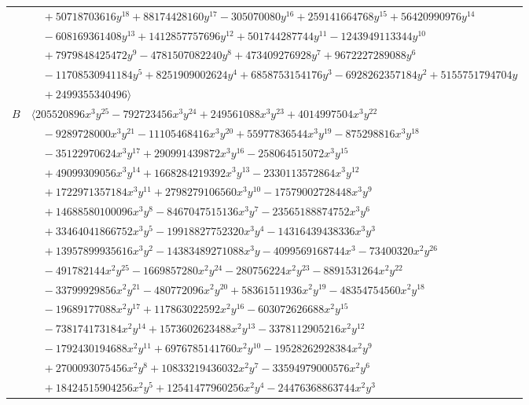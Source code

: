 \documentclass[11pt]{article}
\begin{document}
\begin{longtable}{@{}ll@{}}
 & $\quad +50718703616y^{18}+88174428160y^{17}-305070080y^{16}+259141664768y^{15}+56420990976y^{14}$\\
 & $\quad -608169361408y^{13}+1412857757696y^{12}+501744287744y^{11}-1243949113344y^{10}$\\
 & $\quad +7979848425472y^{9}-4781507082240y^{8}+473409276928y^{7}+9672227289088y^{6}$\\
 & $\quad -11708530941184y^{5}+8251909002624y^{4}+6858753154176y^{3}-6928262357184y^{2}+5155751794704y$\\
 & $\quad +2499355340496\rangle$\\
$B$ & $\langle 205520896x^{3}y^{25}-792723456x^{3}y^{24}+249561088x^{3}y^{23}+4014997504x^{3}y^{22}$\\
 & $\quad -9289728000x^{3}y^{21}-11105468416x^{3}y^{20}+55977836544x^{3}y^{19}-875298816x^{3}y^{18}$\\
 & $\quad -35122970624x^{3}y^{17}+290991439872x^{3}y^{16}-258064515072x^{3}y^{15}$\\
 & $\quad +49099309056x^{3}y^{14}+1668284219392x^{3}y^{13}-2330113572864x^{3}y^{12}$\\
 & $\quad +1722971357184x^{3}y^{11}+2798279106560x^{3}y^{10}-17579002728448x^{3}y^{9}$\\
 & $\quad +14688580100096x^{3}y^{8}-8467047515136x^{3}y^{7}-23565188874752x^{3}y^{6}$\\
 & $\quad +33464041866752x^{3}y^{5}-19918827752320x^{3}y^{4}-14316439438336x^{3}y^{3}$\\
 & $\quad +13957899935616x^{3}y^{2}-14383489271088x^{3}y-4099569168744x^{3}-73400320x^{2}y^{26}$\\
 & $\quad -491782144x^{2}y^{25}-1669857280x^{2}y^{24}-280756224x^{2}y^{23}-8891531264x^{2}y^{22}$\\
 & $\quad -33799929856x^{2}y^{21}-480772096x^{2}y^{20}+58361511936x^{2}y^{19}-48354754560x^{2}y^{18}$\\
 & $\quad -19689177088x^{2}y^{17}+117863022592x^{2}y^{16}-603072626688x^{2}y^{15}$\\
 & $\quad -738174173184x^{2}y^{14}+1573602623488x^{2}y^{13}-3378112905216x^{2}y^{12}$\\
 & $\quad -1792430194688x^{2}y^{11}+6976785141760x^{2}y^{10}-19528262928384x^{2}y^{9}$\\
 & $\quad +2700093075456x^{2}y^{8}+10833219436032x^{2}y^{7}-33594979000576x^{2}y^{6}$\\
 & $\quad +18424515904256x^{2}y^{5}+12541477960256x^{2}y^{4}-24476368863744x^{2}y^{3}$\\

\end{longtable}
\end{document}
